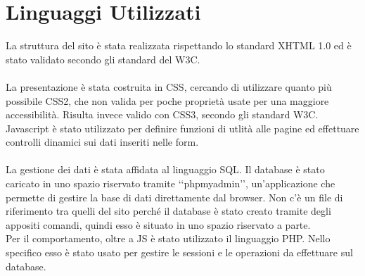 \section{Linguaggi Utilizzati}{
	La struttura del sito è stata realizzata rispettando lo standard XHTML 1.0 ed è stato validato secondo gli standard del W3C. \\
	\\
	La presentazione è stata costruita in CSS, cercando di utilizzare quanto più possibile CSS2, che non valida per poche proprietà usate per una maggiore accessibilità. Risulta invece valido con CSS3, secondo gli standard W3C.
	\\
	Javascript è stato utilizzato per definire funzioni di utlità alle pagine ed effettuare controlli dinamici sui dati inseriti nelle form.\\
	\\
	La gestione dei dati è stata affidata al linguaggio SQL. Il database è stato caricato in uno spazio riservato tramite ‘‘phpmyadmin’’, un'applicazione che permette di gestire la base di dati direttamente dal browser. Non c'è un file di riferimento tra quelli del sito perché il database è stato creato tramite degli appositi comandi, quindi esso è situato in uno spazio riservato a parte.
	\\
	Per il comportamento, oltre a JS è stato utilizzato il linguaggio PHP. Nello specifico esso è stato usato per gestire le sessioni e le operazioni da effettuare sul database.
	\\
}